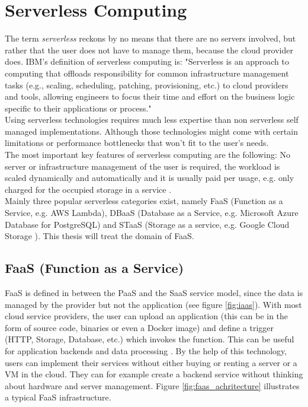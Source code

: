 \section{Serverless Computing}
\label{sec:serverless}
The term \textit{serverless} reckons by no means that there are no servers involved, but rather that the user does not have to manage them, because the cloud provider does.
\gls{IBM}'s definition of serverless computing is: "Serverless is an approach to computing that offloads responsibility for common infrastructure management tasks (e.g., scaling, scheduling, patching, provisioning, etc.) to cloud providers and tools, allowing engineers to focus their time and effort on the business logic specific to their applications or process." \cite{serverlessibm}\\
Using serverless technologies requires much less expertise than non serverless self managed implementations. Although those technologies might come with certain limitations or performance bottlenecks that won't fit to the user's needs.\\
The most important key features of serverless computing are the following: No server or infrastructure management of the user is required, the workload is scaled dynamically and automatically and it is usually paid per usage, e.g. only charged for the occupied storage in a service \cite{serverlessaws, serverlessazure}.\\
Mainly three popular serverless categories exist, namely FaaS (Function as a Service, e.g. \gls{AWS} Lambda), DBaaS (Database as a Service, e.g. Microsoft Azure Database for PostgreSQL) and STaaS (Storage as a service, e.g. Google Cloud Storage \cite{serverlessgoogle}). This thesis will treat the domain of FaaS.
\subsection*{FaaS (Function as a Service)}
\gls{FaaS} is defined in between the \gls{PaaS} and the \gls{SaaS} service model, since the data is managed by the provider but not the application (see figure \ref{fig:iaas}). With most cloud service providers, the user can upload an application (this can be in the form of source code, binaries or even a Docker image) and define a trigger (\gls{HTTP}, Storage, Database, etc.) which invokes the function. This can be useful for application backends and data processing \cite{AWSLambda, GoogleFunctions}. By the help of this technology, users can implement their services without either buying or renting a server or a \gls{VM} in the cloud. They can for example create a backend service without thinking about hardware and server management. Figure \ref{fig:faas_achritecture} illustrates a typical \gls{FaaS} infrastructure.

